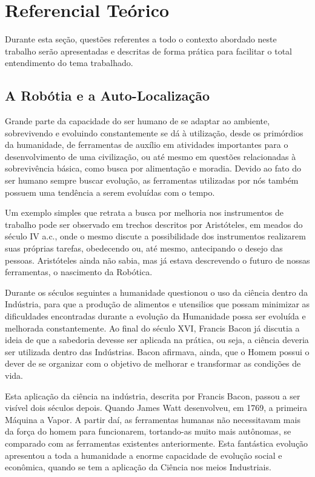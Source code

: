 
\chapter[Referencial Teórico]{Referencial Teórico}
	
	Durante esta seção, questões referentes a todo o contexto abordado neste trabalho serão apresentadas e descritas de forma prática para facilitar o total entendimento do tema trabalhado.

\section{A Robótia e a Auto-Localização}

	Grande parte da capacidade do ser humano de se adaptar ao ambiente, sobrevivendo e evoluindo constantemente se dá à utilização, desde os primórdios da humanidade, de ferramentas de auxílio em atividades importantes para o desenvolvimento de uma civilização, ou até mesmo em questões relacionadas à sobrevivência básica, como busca por alimentação e moradia. Devido ao fato do ser humano sempre buscar evolução, as ferramentas utilizadas por nós também possuem uma tendência a serem evoluídas com o tempo.

	Um exemplo simples que retrata a busca por melhoria nos instrumentos de trabalho pode ser observado em trechos descritos por Aristóteles, em meados do século IV a.c., onde o mesmo discute a possibilidade dos instrumentos realizarem suas próprias tarefas, obedecendo ou, até mesmo, antecipando o desejo das pessoas. Aristóteles ainda não sabia, mas já estava descrevendo o futuro de nossas ferramentas, o nascimento da Robótica.

	Durante os séculos seguintes a humanidade questionou o uso da ciência dentro da Indústria, para que a produção de alimentos e utensilios que possam minimizar as dificuldades encontradas durante a evolução da Humanidade possa ser evoluída e melhorada constantemente. Ao final do século XVI, Francis Bacon já discutia a ideia de que a sabedoria devesse ser aplicada na prática, ou seja, a ciência deveria ser utilizada dentro das Indústrias. Bacon afirmava, ainda, que o Homem possui o dever de se organizar com o objetivo de melhorar e transformar as condições de vida.

	Esta aplicação da ciência na indústria, descrita por Francis Bacon, passou a ser visível dois séculos depois. Quando James Watt desenvolveu, em 1769, a primeira Máquina a Vapor. A partir daí, as ferramentas humanas não necessitavam mais da força do homem para funcionarem, tortando-as muito mais autônomas, se comparado com as ferramentas existentes anteriormente. Esta fantástica evolução apresentou a toda a humanidade a enorme capacidade de evolução social e econômica, quando se tem a aplicação da Ciência nos meios Industriais.

